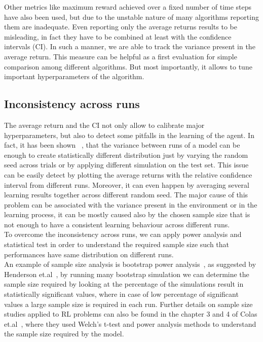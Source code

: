 \documentclass{article}
\begin{document}
Other metrics like maximum reward achieved over a fixed number of time steps have also been used, but  due to the unstable nature of many algorithms reporting them are inadequate. Even reporting only the average returns results to be misleading, in fact they have to be combined at least with the confidence intervals (CI). In such a manner, we are able to track the variance present in the average return. This measure can be helpful as a first evaluation for simple comparison among different algorithms. But most importantly, it allows to tune important hyperparameters of the algorithm.
\subsection{Inconsistency across runs}
The average return and the CI not only allow to calibrate major hyperparameters, but also to detect some pitfalls in the learning of the agent. In fact, it has been shown ~\cite{DRL01}, that the variance between runs of a model can be enough to create statistically different distribution just by varying the random seed across trials or by applying different simulation on the test set. This issue can be easily detect by plotting the average returns with the relative confidence interval from different runs.
Moreover, it can even happen by averaging several learning results together across different random seed.
The major cause of this problem can be associated with the variance present in the environment or in the learning process, it can be mostly caused also by the chosen sample size that is not enough to have a consistent learning behaviour across different runs.\\
To overcome the inconsistency across runs, we can apply power analysis and statistical test in order to understand the required sample size such that performances have same distribution on different runs.\\
An example of sample size analysis is bootstrap power analysis~\cite{pwranaly2}, as suggested by Henderson et.al~\cite{DRL01}, by running many bootstrap simulation we can determine the sample size required by looking at the percentage of the simulations result in statistically significant values, where in case of low percentage of significant values a large sample size is required in each run. Further details on sample size studies applied to RL problems can also be found in the chapter 3 and 4 of Colas et.al~\cite{PowerAnalysis}, where they used Welch's t-test and power analysis methods to understand the sample size required by the model.
\end{document}
